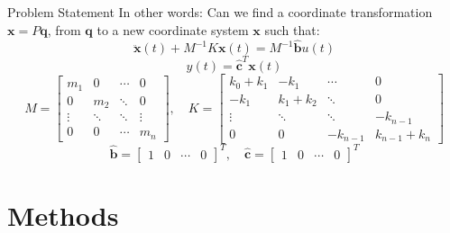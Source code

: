 \documentclass{beamer}
\begin{document}
\begin{frame}{Problem Statement}
In other words: Can we find a coordinate transformation $\mathbf{x} = P \mathbf{q}$, from $\mathbf{q}$ to a new coordinate system $\mathbf{x}$
such that:
\begin{equation}
\ddot{\mathbf{x}}(t) + M^{-1} K\mathbf{x}(t) = M^{-1} \mathbf{\hat{b}}u(t)
\end{equation}
\begin{equation}
y(t) = \mathbf{\hat{c}}^T \mathbf{x}(t)
\end{equation}
\footnotesize
$$
M = \begin{bmatrix}
m_1  &  0 & \cdots & 0 \\
0 & m_2  & \ddots & 0 \\
\vdots & \ddots & \ddots & \vdots \\
0 & 0 & \cdots & m_n \end{bmatrix}
, \quad
K = \begin{bmatrix}
k_0+k_1  &  -k_1  & \cdots & 0 \\
-k_1 & k_1+k_2   & \ddots & 0 \\
\vdots & \ddots & \ddots & -k_{n-1} \\
0 & 0  & -k_{n-1} &  k_{n-1} + k_n \end{bmatrix}
$$
\normalsize
$$
\mathbf{\hat{b}} = \begin{bmatrix} 1 & 0 & \cdots & 0 \end{bmatrix}^T
,\quad \mathbf{\hat{c}} = \begin{bmatrix} 1 & 0 & \cdots & 0 \end{bmatrix}^T
$$
\centering

\end{frame}

\section{Methods}
\end{document}
